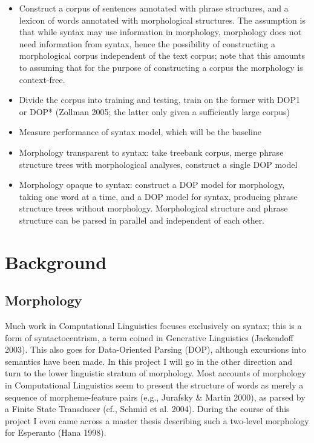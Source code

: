 \documentclass[10pt,a4paper]{article}
\begin{document}
\begin{itemize}
\item Construct a corpus of sentences annotated with phrase structures, and a 
lexicon of words annotated with morphological structures. The assumption is
that while syntax may use information in morphology, morphology does not need
information from syntax, hence the possibility of constructing a morphological
corpus independent of the text corpus; note that this amounts to assuming that
for the purpose of constructing a corpus the morphology is context-free.
\item Divide the corpus into training and testing, train on the former with DOP1 or 
DOP* (Zollman 2005; the latter only given a sufficiently large corpus)
\item Measure performance of syntax model, which will be the baseline
\item Morphology transparent to syntax: take treebank corpus, merge phrase 
structure trees with morphological analyses, construct a single DOP model
\item Morphology opaque to syntax: construct a DOP model for morphology, taking
one word at a time, and a DOP model for syntax, producing phrase structure
trees without morphology. Morphological structure and phrase structure can be
parsed in parallel and independent of each other.
\end{itemize}

\section{Background}
\subsection{Morphology}

Much work in Computational Linguistics focuses exclusively on syntax; this is
a form of syntactocentrism, a term coined in Generative Linguistics 
(Jackendoff 2003). This also goes for Data-Oriented Parsing (DOP), although
excursions into semantics have been made. In this project I will go in the
other direction and turn to the lower linguistic stratum of morphology. Most
accounts of morphology in Computational Linguistics seem to present the
structure of words as merely a sequence of morpheme-feature pairs (e.g.,
Jurafsky \& Martin 2000), as parsed by a Finite State Transducer (cf., Schmid
et al.  2004). During the course of this project I even came across a master
thesis describing such a two-level morphology for Esperanto (Hana 1998).
\end{document}

